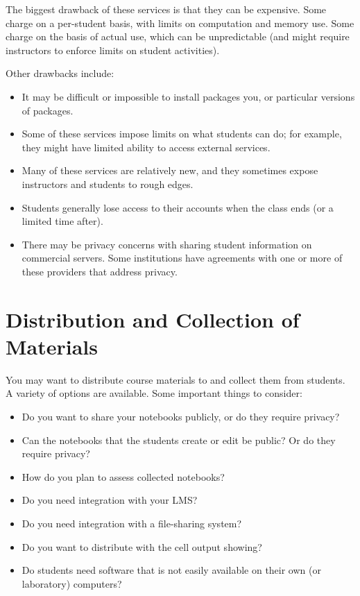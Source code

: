 \documentclass[]{book}
\providecommand{\tightlist}{%
  \setlength{\itemsep}{0pt}\setlength{\parskip}{0pt}}
\begin{document}
The biggest drawback of these services is that they can be expensive.
Some charge on a per-student basis, with limits on computation and
memory use. Some charge on the basis of actual use, which can be
unpredictable (and might require instructors to enforce limits on
student activities).

Other drawbacks include:

\begin{itemize}
\tightlist
\item
  It may be difficult or impossible to install packages you, or
  particular versions of packages.
\item
  Some of these services impose limits on what students can do; for
  example, they might have limited ability to access external services.
\item
  Many of these services are relatively new, and they sometimes expose
  instructors and students to rough edges.
\item
  Students generally lose access to their accounts when the class ends
  (or a limited time after).
\item
  There may be privacy concerns with sharing student information on
  commercial servers. Some institutions have agreements with one or more
  of these providers that address privacy.
\end{itemize}

\section{Distribution and Collection of
Materials}\label{distribution-and-collection-of-materials}

You may want to distribute course materials to and collect them from
students. A variety of options are available. Some important things to
consider:

\begin{itemize}
\tightlist
\item
  Do you want to share your notebooks publicly, or do they require
  privacy?
\item
  Can the notebooks that the students create or edit be public? Or do
  they require privacy?
\item
  How do you plan to assess collected notebooks?
\item
  Do you need integration with your LMS?
\item
  Do you need integration with a file-sharing system?
\item
  Do you want to distribute with the cell output showing?
\item
  Do students need software that is not easily available on their own
  (or laboratory) computers?
\end{itemize}
\end{document}
